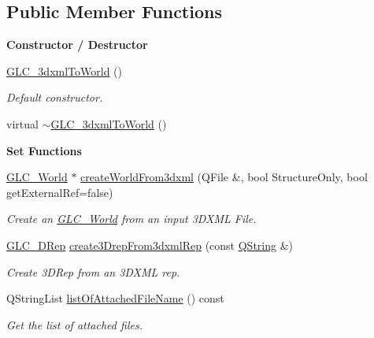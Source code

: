 \subsection*{Public Member Functions}
\begin{Indent}{\bf Constructor / Destructor}\par
\begin{DoxyCompactItemize}
\item 
\hyperlink{class_g_l_c__3dxml_to_world_a9ee24d9d07c01b20fa1a91e86ab9e6b1}{G\-L\-C\-\_\-3dxml\-To\-World} ()
\begin{DoxyCompactList}\small\item\em Default constructor. \end{DoxyCompactList}\item 
virtual \hyperlink{class_g_l_c__3dxml_to_world_a6e5bb1b9ca49bbb66d3a916809278775}{$\sim$\-G\-L\-C\-\_\-3dxml\-To\-World} ()
\end{DoxyCompactItemize}
\end{Indent}
\begin{Indent}{\bf Set Functions}\par
\begin{DoxyCompactItemize}
\item 
\hyperlink{class_g_l_c___world}{G\-L\-C\-\_\-\-World} $\ast$ \hyperlink{class_g_l_c__3dxml_to_world_a05da53915c938de930894260a964a62b}{create\-World\-From3dxml} (Q\-File \&, bool Structure\-Only, bool get\-External\-Ref=false)
\begin{DoxyCompactList}\small\item\em Create an \hyperlink{class_g_l_c___world}{G\-L\-C\-\_\-\-World} from an input 3\-D\-X\-M\-L File. \end{DoxyCompactList}\item 
\hyperlink{class_g_l_c__3_d_rep}{G\-L\-C\-\_\-D\-Rep} \hyperlink{class_g_l_c__3dxml_to_world_a0a3459bbdf45d453ae183bd960d53c0a}{create3\-Drep\-From3dxml\-Rep} (const \hyperlink{group___u_a_v_objects_plugin_gab9d252f49c333c94a72f97ce3105a32d}{Q\-String} \&)
\begin{DoxyCompactList}\small\item\em Create 3\-D\-Rep from an 3\-D\-X\-M\-L rep. \end{DoxyCompactList}\item 
Q\-String\-List \hyperlink{class_g_l_c__3dxml_to_world_a911fdf1a45a60348c05c8f4fa1d9cb36}{list\-Of\-Attached\-File\-Name} () const 
\begin{DoxyCompactList}\small\item\em Get the list of attached files. \end{DoxyCompactList}\end{DoxyCompactItemize}
\end{Indent}


